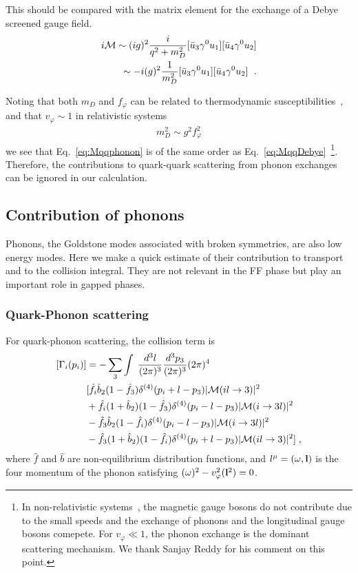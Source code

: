 \documentclass[10pt, aps, prd, superscriptaddress, nofootinbib, 
               amsmath, amssymb, twocolumn,
               preprintnumbers, showpacs,
               raggedbottom,
               floatfix]{revtex4-1}
\newcommand{\dthree}[1]{\frac{d^3#1}{(2\pi)^3}}
\newcommand{\calM}{{\cal{M}}}
\newcommand{\bfl}{{\bf{l}}}
\newcommand{\hatb}{{\hat{b}}}
\newcommand{\hatf}{{\hat{f}}}
\begin{document}
This should be compared with the matrix element for the exchange of a Debye 
screened gauge field.  
\begin{equation}
\begin{split}
i\calM \sim (ig)^2
\frac{i}{q^2+m_D^2}[\bar{u}_3\gamma^0 u_1]
[\bar{u}_4\gamma^0 u_2]\\
\sim -i(g)^2
\frac{1}{m_D^2}[\bar{u}_3\gamma^0 u_1]
[\bar{u}_4\gamma^0 u_2]~\label{eq:MqqDebye}
\;.
\end{split}
\end{equation}

Noting that both $m_D$ and $f_\varphi$ can be related to thermodynamic
susceptibilities~\cite{Son:1999cm}, and that $v_\varphi\sim 1$ in relativistic systems
\begin{equation}
\begin{split}
m_D^2\sim g^2 f_\varphi^2
\end{split}
\end{equation}
we see that Eq.~\ref{eq:Mqqphonon} is of the same order as
Eq.~\ref{eq:MqqDebye}~\footnote{In non-relativistic systems~\cite{Ziman:1960},
the magnetic gauge bosons do not contribute due to the small speeds and the exchange of phonons and the
longitudinal gauge bosons comepete. For $v_\varphi\ll1$, the phonon exchange is
the dominant scattering mechanism. We thank Sanjay Reddy for his comment on
this point.}. Therefore, the contributions to quark-quark scattering from phonon exchanges
can be ignored in our calculation.


\subsection{Contribution of phonons}
\label{sec:phonons}
Phonons, the Goldstone modes associated with broken symmetries, are also low 
energy modes. Here we make a quick estimate of their contribution to transport
and to the collision integral. They are not relevant in the FF phase but play
an important role in gapped phases.

\subsubsection{Quark-Phonon scattering}
\label{sec:qph}
For quark-phonon scattering, the collision term is
\begin{equation}
\begin{split}
[\Gamma_{i}(p_i)]&=-\sum_3\int\;
\dthree{l}\dthree{p_3}(2\pi)^4\\
&[
\hatf_i\hatb_2(1-\hatf_3)\delta^{(4)}(p_i+l-p_3)|\calM(il\rightarrow3)|^2\\
&
+\hatf_i(1+\hatb_2)(1-\hatf_3)\delta^{(4)}(p_i-l-p_3)|\calM(i\rightarrow3l)|^2\\
&
-\hatf_3\hatb_2(1-\hatf_i)\delta^{(4)}(p_i-l-p_3)|\calM(i\rightarrow3l)|^2\\
&
-\hatf_3(1+\hatb_2)(1-\hatf_i)\delta^{(4)}(p_i+l-p_3)|\calM(il\rightarrow3)|^2]\;,
\end{split}
\end{equation}
where $\hatf$ and $\hatb$ are non-equilibrium distribution functions, and
$l^\mu=(\omega,\bfl)$ is the four momentum of the phonon satisfying
$(\omega)^2-v_{\varphi}^2(\bfl^2)=0$. 
\end{document}
